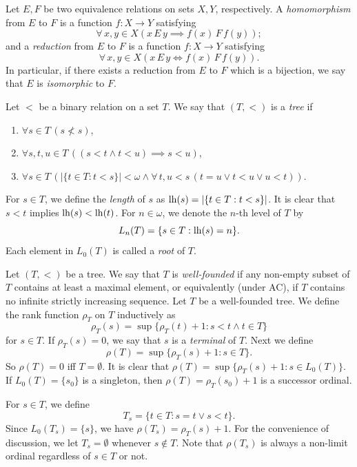 \documentclass[11pt]{amsart}
\theoremstyle{definition}
\theoremstyle{remark}
\numberwithin{equation}{section}
\begin{document}
Let $E,F$ be two equivalence relations on sets $X,Y$, respectively. A {\it homomorphism} from $E$ to $F$ is a function $f:X\to Y$ satisfying
\begin{equation*}
    \forall\,x,y\in X\left(x\,E\,y\implies f(x)\,F\,f(y)\right);
\end{equation*}
and a {\it reduction} from $E$ to $F$ is a function $f:X\to Y$ satisfying
\begin{equation*}
    \forall\,x,y\in X\left(x\,E\,y\Longleftrightarrow f(x)\,F\,f(y)\right).
\end{equation*}
In particular, if there exists a reduction from $E$ to $F$ which is a bijection, we say that $E$ is {\it isomorphic} to $F$.

Let $<$ be a binary relation on a set $T$. We say that $(T,<)$ is a {\it tree} if
\begin{enumerate}
\item[(1)] $\forall s\in T\,(s\not<s)$,
\item[(2)] $\forall s,t,u\in T\,((s<t\land t<u)\implies s<u)$,
\item[(3)] $\forall s\in T\,(|\{t\in T:t<s\}|<\omega\land\forall\,t,u<s\,(t=u\lor t<u\lor u<t))$.
\end{enumerate}
For $s\in T$, we define the {\it length} of $s$ as ${\rm lh}(s)=|\{t\in T:t<s\}|$. It is clear that $s<t$ implies ${\rm lh}(s)<{\rm lh}(t)$. For $n\in\omega$, we denote the $n$-th level of $T$ by
$$L_n(T)=\{s\in T:{\rm lh}(s)=n\}.$$
Each element in $L_0(T)$ is called a {\it root} of $T$.

Let $(T,<)$ be a tree. We say that $T$ is {\it well-founded} if any non-empty subset of $T$ contains at least a maximal element, or equivalently (under AC), if $T$ contains no infinite strictly increasing sequence. Let $T$ be a well-founded tree. We define the rank function $\rho_T$ on $T$ inductively as
$$\rho_T(s)=\sup\{\rho_T(t)+1:s<t\land t\in T\}$$
for $s\in T$. If $\rho_T(s)=0$, we say that $s$ is a {\it terminal} of $T$. Next we define
$$\rho(T)=\sup\{\rho_T(s)+1:s\in T\}.$$
So $\rho(T)=0$ iff $T=\emptyset$. It is clear that $\rho(T)=\sup\{\rho_T(s)+1:s\in L_0(T)\}$. If $L_0(T)=\{s_0\}$ is a singleton, then $\rho(T)=\rho_T(s_0)+1$ is a successor ordinal.

For $s\in T$, we define
$$T_s=\{t\in T:s=t\vee s<t\}.$$
Since $L_0(T_s)=\{s\}$, we have $\rho(T_s)=\rho_T(s)+1$. For the convenience of discussion, we let $T_s=\emptyset$ whenever $s\notin T$. Note that $\rho(T_s)$ is always a non-limit ordinal regardless of $s\in T$ or not.
\end{document}

